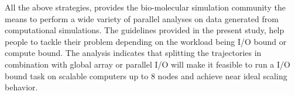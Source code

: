 All the above strategies, provides the bio-molecular simulation community the means to perform a wide variety of parallel analyses on data generated from computational simulations.
The guidelines provided in the present study, help people to tackle their problem depending on the workload being I/O bound or compute bound. 
The analysis indicates that splitting the trajectories in combination with global array or parallel I/O will make it feasible to run a I/O bound task on scalable computers up to 8 nodes and achieve near ideal scaling behavior.